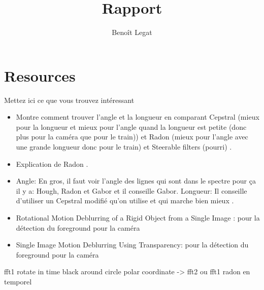 \documentclass{article}
\title{Rapport}
\author{Benoît Legat}
\begin{document}
\maketitle

\section{Resources}
Mettez ici ce que vous trouvez intéressant
\begin{itemize}
  \item Montre comment trouver l'angle et la longueur en comparant Cepstral (mieux pour la longueur et mieux pour l'angle quand la longueur est petite (donc plus pour la caméra que pour le train)) et Radon (mieux pour l'angle avec une grande longueur donc pour le train) et Steerable filters (pourri) \cite{krahmer2006blind}.
  \item Explication de Radon \cite{oliveira2007blind}.
  \item Angle: En gros, il faut voir l'angle des lignes qui sont dans le spectre pour ça il y a: Hough, Radon et Gabor et il conseille Gabor.
    Longueur: Il conseille d'utiliser un Cepstral modifié qu'on utilise et qui marche bien mieux \cite{Deshpande2014606}.
   \item  Rotational Motion Deblurring of a Rigid Object from a Single Image : pour la détection du foreground pour la caméra
   \item  Single Image Motion Deblurring Using Transparency: pour la détection du foreground pour la caméra
\end{itemize}

fft1
rotate in time
black around circle
polar coordinate -> fft2 ou fft1
radon en temporel
\end{document}
